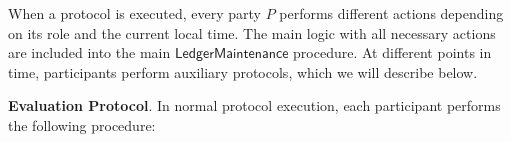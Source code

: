 When a protocol is executed, every party $P$ performs different actions depending on its role and the current local time.
The main logic with all necessary actions are included into the main $\textsf{LedgerMaintenance}$ procedure.
At different points in time, participants perform auxiliary protocols, which we will describe below.

\bigbreak
\noindent
{}
\textbf{Evaluation Protocol}.\label{apndx:eval-protocol}
In normal protocol execution, each participant performs the following procedure:
\begin{protocol}
    \caption{$\textsf{EvaluationProcedure}(P, \text{sid}, R, sl, \textsf{buffer}, \textsf{syncBuffer}, \mathcal{C}_{\text{loc}}, \mathbf{S}_P^{\text{set}})$}
\end{protocol}
